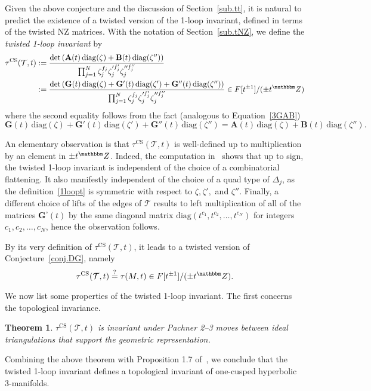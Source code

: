 \documentclass[12pt,reqno]{amsart}
\newtheorem{theorem}{Theorem}[section]
\theoremstyle{definition}
\def\BZ{\mathbbm Z}
\def\calT{\mathcal T}
\def\be{\begin{equation}}
\def\ee{\end{equation}}
\def\CS{\mathrm{CS}}
\def\diag{\mathrm{diag}}
\begin{document}
Given the above conjecture and the discussion of Section~\ref{sub.tt}, it
is natural to predict the existence of a twisted version of the 1-loop invariant,
defined in terms of the twisted NZ matrices. With the notation of
Section~\ref{sub.tNZ}, we define the \emph{twisted 1-loop invariant}  by 
\be
\label{1loopt}
\begin{aligned}
\tau^\CS(\calT,t)
&:=
\frac{\det\left(
\mathbf{A}(t)  \, \mathrm{diag}(\zeta) + \mathbf{B}(t) \, \mathrm{diag}(\zeta'')
\right)}{
\prod_{j=1}^N\zeta_j^{f_j} \zeta_j'^{f_j'} \zeta_j''^{f_j''}} \\
& := \frac{\det\left(
\mathbf{G}(t)\, \mathrm{diag}(\zeta)+\mathbf{G}'(t) \,
\mathrm{diag}(\zeta')+\mathbf{G}''(t) \,
\mathrm{diag}(\zeta'') \right)}{
\prod_{j=1}^N\zeta_j^{f_j} \zeta_j'^{f_j'} \zeta_j''^{f_j''}}
\in F[t^{\pm1}]/ (\pm t^\BZ)
\end{aligned}
\ee
where the second equality follows from the fact (analogous to Equation~\eqref{3GAB})
\be
\label{3GABt}
\mathbf{G}(t)\, \mathrm{diag}(\zeta)
+\mathbf{G}'(t) \, \mathrm{diag}(\zeta')
+ \mathbf{G}''(t) \, \mathrm{diag}(\zeta'')
= \mathbf{A}(t)  \, \mathrm{diag}(\zeta) + \mathbf{B}(t) \, \mathrm{diag}(\zeta'').
\ee

An elementary observation is that $\tau^\CS(\calT,t)$ is well-defined up to
multiplication by an element in $\pm t^\BZ$. Indeed, the computation
in~\cite[Sec.3.5]{DG1} shows that up to sign, the twisted 1-loop
invariant is independent of the choice of a combinatorial flattening. 
It also manifestly independent of the choice of a quad type of $\Delta_j$, as the
definition~\eqref{1loopt} is symmetric with respect to
$\zeta,\zeta',$ and $\zeta''$. Finally, a different choice of lifts of the
edges of $\calT$ results to left multiplication of all of the matrices
$\mathbf{G}^\square(t)$ by the same diagonal matrix $\diag(t^{c_1},t^{c_2},\dots,t^{c_N})$
for integers $c_1,c_2,\dots,c_N$, hence the observation follows. 

By its very definition of $\tau^\CS(\calT,t)$, it leads to a twisted version of
Conjecture~\eqref{conj.DG}, namely 
\be
\label{TT}
\tau^\CS(\calT,t) \stackrel{?}=  \tau(M,t) \in F[t^{\pm1}]/ (\pm t^\BZ)  .
\ee

We now list some properties of the twisted 1-loop invariant. The first concerns
the topological invariance.

\begin{theorem}
\label{thm.top}
$\tau^\CS(\calT,t)$ is invariant under Pachner 2--3 moves between ideal triangulations
that support the geometric representation.
\end{theorem}
Combining the above theorem with Proposition 1.7 of~\cite{DG1}, we conclude that the
twisted 1-loop invariant defines a topological invariant of one-cusped hyperbolic
3-manifolds.
\end{document}
